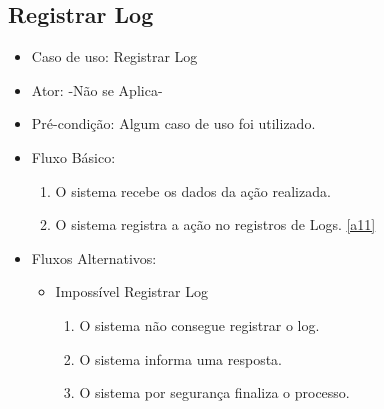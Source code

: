 \documentclass{utfpr-pg}
\begin{document}
    \subsection{Registrar Log} \label{registrarlog}
        \begin{itemize}
        \item Caso de uso: Registrar Log
        \item Ator: -Não se Aplica-
        \item Pré-condição: Algum caso de uso foi utilizado.
        \item Fluxo Básico:
             \begin{enumerate}[label=\textbf{\arabic*}]
                \item \label{a01} O sistema recebe os dados da ação realizada.
                \item O sistema registra a ação no registros de Logs. \ref{a11} 
            \end{enumerate}
        \item Fluxos Alternativos:
            \begin{itemize}
            \item Impossível Registrar Log
            \begin{enumerate}[label=\textbf{2.1.\arabic*}]
                \item \label{a11} O sistema não consegue registrar o log.
                \item O sistema informa uma resposta.
                \item O sistema por segurança finaliza o processo.
            \end{enumerate}
            \end{itemize}
        \end{itemize}
    
\end{document}
